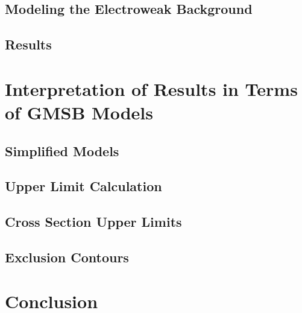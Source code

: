 \documentclass[12pt, letterpaper]{report}
\begin{document}
\section{Modeling the Electroweak Background}
\section{Results}

\chapter{Interpretation of Results in Terms of GMSB Models}
\section{Simplified Models}
\section{Upper Limit Calculation}
\section{Cross Section Upper Limits}
\section{Exclusion Contours}

\chapter{Conclusion}
\end{document}
